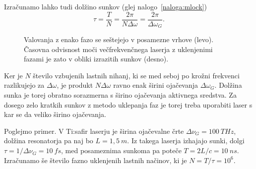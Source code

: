 Izračunamo lahko tudi dolžino sunkov (glej nalogo~\ref{naloga:mlock})
\begin{equation}
\tau=\frac{T}{N}=\frac{2\pi }{N\Delta \omega }=\frac{2\pi }{\Delta\omega_{G}}.
\label{5.37}
\end{equation}
\begin{figure}[h]
\centering
\def\svgwidth{140truemm} 

\caption{Valovanja z enako fazo se seštejejo v posamezne vrhove (levo). 
Časovna odvisnost moči večfrekvenčnega laserja z uklenjenimi fazami je 
zato v obliki izrazitih sunkov (desno).}
\label{s5.10}
\end{figure}
Ker je $N$ število vzbujenih lastnih nihanj, ki se med seboj po krožni 
frekvenci razlikujejo za $\Delta \omega$, je produkt $N\Delta \omega$ ravno enak
širini ojačevanja $\Delta \omega_{G}$. Dolžina sunka je torej obratno sorazmerna s širino
ojačevanja aktivnega sredstva. Za dosego zelo kratkih sunkov z metodo uklepanja
faz je torej treba uporabiti laser s kar se da veliko širino ojačevanja. 

Poglejmo primer. V Ti:safir laserju je širina ojačevalne črte $\Delta \nu_G = 100~\si{THz}$, 
dolžina resonatorja pa naj bo $L=1,5~\si{m}$. Iz takega laserja izhajajo
sunki, dolgi $\tau = 1/\Delta \nu_G = 10~\si{fs}$, med posameznima sunkoma 
pa poteče $T = 2L/c = 10~\si{ns}$. Izračunamo še število fazno uklenjenih lastnih načinov, ki je 
$N = T/\tau = 10^6$.

